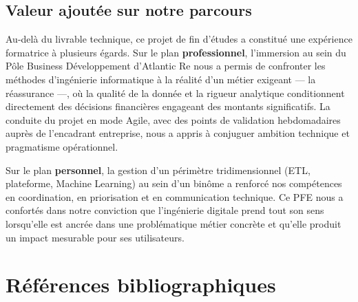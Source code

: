 \documentclass[12pt,a4paper]{report}
\begin{document}
\section*{Valeur ajoutée sur notre parcours}

Au-delà du livrable technique, ce projet de fin d'études a constitué une expérience
formatrice à plusieurs égards. Sur le plan \textbf{professionnel}, l'immersion au sein
du Pôle Business Développement d'Atlantic Re nous a permis de confronter les méthodes
d'ingénierie informatique à la réalité d'un métier exigeant --- la réassurance ---,
où la qualité de la donnée et la rigueur analytique conditionnent directement des
décisions financières engageant des montants significatifs. La conduite du projet en
mode Agile, avec des points de validation hebdomadaires auprès de l'encadrant
entreprise, nous a appris à conjuguer ambition technique et pragmatisme opérationnel.

Sur le plan \textbf{personnel}, la gestion d'un périmètre tridimensionnel (ETL,
plateforme, Machine Learning) au sein d'un binôme a renforcé nos compétences en
coordination, en priorisation et en communication technique. Ce PFE nous a confortés
dans notre conviction que l'ingénierie digitale prend tout son sens lorsqu'elle est
ancrée dans une problématique métier concrète et qu'elle produit un impact mesurable
pour ses utilisateurs.

\clearpage

\chapter*{Références bibliographiques}
\end{document}
